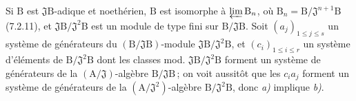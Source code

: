 Si $\mathrm{B}$ est $\mathfrak{J}\mathrm{B}$-adique et noethérien, $\mathrm{B}$ est isomorphe à $\varprojlim \mathrm{B}_n$, où $\mathrm{B}_n=\mathrm{B}/\mathfrak{J}^{n+1}\mathrm{B}$ (7.2.11), et $\mathfrak{J}\mathrm{B}/\mathfrak{J}^2\mathrm{B}$ est un module de type fini sur $\mathrm{B}/\mathfrak{J}\mathrm{B}$. Soit $(a_j)_{1\leqslant j\leqslant s}$ un système de générateurs du $(\mathrm{B}/\mathfrak{J}\mathrm{B})$-module $\mathfrak{J}\mathrm{B}/\mathfrak{J}^2\mathrm{B}$, et $(c_i)_{1\leqslant i\leqslant r}$ un système d’éléments de $\mathrm{B}/\mathfrak{J}^2\mathrm{B}$ dont les classes mod. $\mathfrak{J}\mathrm{B}/\mathfrak{J}^2\mathrm{B}$ forment un système de générateurs de la $(\mathrm{A}/\mathfrak{J})$-algèbre $\mathrm{B}/\mathfrak{J}\mathrm{B}$\,; on voit aussitôt que les $c_i a_j$ forment un système de générateurs de la $(\mathrm{A}/\mathfrak{J}^2)$-algèbre $\mathrm{B}/\mathfrak{J}^2\mathrm{B}$, donc \textit{a)} implique \textit{b)}.

